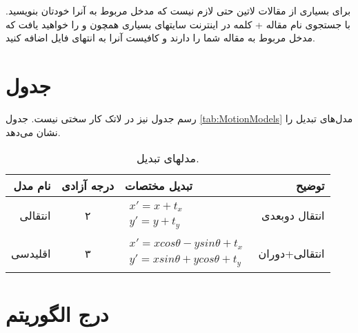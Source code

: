 برای بسیاری از مقالات لاتین حتی لازم نیست که مدخل مربوط به آنرا خودتان بنویسید. با جستجوی نام مقاله + کلمه   در اینترنت سایتهای بسیاری همچون  و  را خواهید یافت که مدخل  مربوط به مقاله شما را دارند و کافیست آنرا به انتهای فایل  اضافه کنید.


\section{جدول}
رسم جدول نیز در لاتک کار سختی نیست.  جدول 
\eqref{tab:MotionModels}
مدل‌های تبدیل را نشان می‌دهد.

\begin{table}[ht]
\caption{مدلهای تبدیل.}
\label{tab:MotionModels}
\centering
\onehalfspacing
\begin{tabular}{|r|c|l|r|}
\hline نام مدل & درجه آزادی & تبدیل مختصات & توضیح \\ 
\hline انتقالی & ۲ & $\begin{aligned} x'=x+t_x \\ y'=y+t_y \end{aligned}$  &  انتقال دوبعدی\\ 
\hline اقلیدسی & ۳ & $\begin{aligned} x'=xcos\theta - ysin\theta+t_x \\ y'=xsin\theta+ycos\theta+t_y \end{aligned}$  &  انتقالی+دوران \\ 
\hline 
\end{tabular} 
\end{table}




\section{درج الگوریتم}
